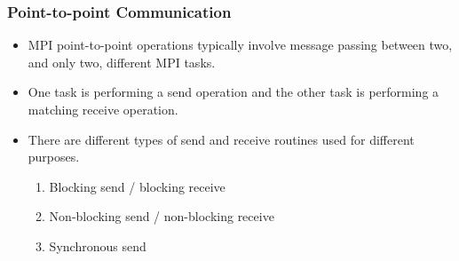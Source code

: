 \documentclass[9pt,c]{beamer}
\begin{document}
\begin{frame}[fragile]
  \frametitle{Point-to-point Communication}
  \begin{itemize}
  \item MPI point-to-point operations typically involve message passing between two, and only two, different MPI tasks. 
  \item One task is performing a send operation and the other task is performing a matching receive operation.
  \item There are different types of send and receive routines used for different purposes.
    \begin{enumerate}
    \item Blocking send / blocking receive
    \item Non-blocking send / non-blocking receive
    \item Synchronous send
    \end{enumerate}
  \end{itemize}
\end{frame}
\end{document}
